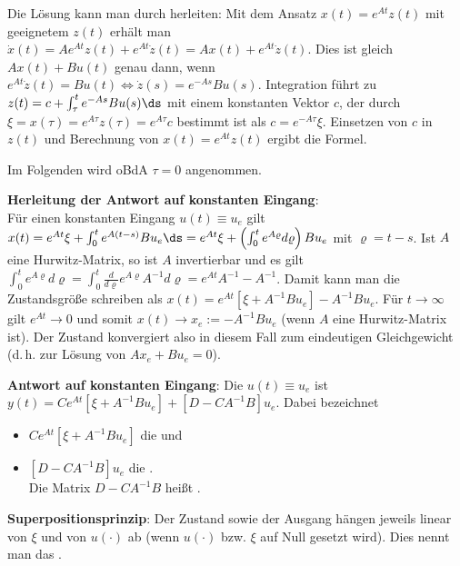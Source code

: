 Die Lösung kann man durch  herleiten:
Mit dem Ansatz $x(t) = e^{At} z(t)$ mit geeignetem $z(t)$
erhält man $\dot{x}(t) = A e^{At} z(t) + e^{At} \dot{z}(t) = Ax(t) + e^{At} \dot{z}(t)$.
Dies ist gleich $Ax(t) + Bu(t)$ genau dann, wenn $e^{At} \dot{z}(t) = Bu(t) \iff
\dot{z}(s) = e^{-As} Bu(s)$.
Integration führt zu $z(t) = c + \int_\tau^t e^{-As} Bu(s) \ds$ mit einem konstanten Vektor $c$,
der durch $\xi = x(\tau) = e^{A\tau} z(\tau) = e^{A\tau} c$ bestimmt ist als
$c = e^{-A\tau} \xi$.
Einsetzen von $c$ in $z(t)$ und Berechnung von $x(t) = e^{At} z(t)$ ergibt die Formel.

\linie

Im Folgenden wird oBdA $\tau = 0$ angenommen.

\textbf{Herleitung der Antwort auf konstanten Eingang}:\\
Für einen konstanten Eingang $u(t) \equiv u_e$ gilt\\
$x(t) = e^{At} \xi + \int_0^t e^{A(t - s)} B u_e \ds =
e^{At} \xi + \left(\int_0^t e^{A\varrho} d\varrho\right) B u_e$ mit $\varrho = t - s$.
Ist $A$ eine Hurwitz-Matrix, so ist $A$ invertierbar und es gilt
$\int_0^t e^{A\varrho} d\varrho = \int_0^t \frac{d}{d\varrho} e^{A\varrho} A^{-1} d\varrho
= e^{At} A^{-1} - A^{-1}$.
Damit kann man die Zustandsgröße schreiben als
$x(t) = e^{At} [\xi + A^{-1} B u_e] - A^{-1} B u_e$.
Für $t \to \infty$ gilt $e^{At} \to 0$ und somit
$x(t) \to x_e := -A^{-1} B u_e$
(wenn $A$ eine Hurwitz-Matrix ist).
Der Zustand konvergiert also in diesem Fall zum eindeutigen Gleichgewicht
(d.\,h. zur Lösung von $Ax_e + Bu_e = 0$).

\textbf{Antwort auf konstanten Eingang}:
Die  $u(t) \equiv u_e$ ist\\
$y(t) = Ce^{At} [\xi + A^{-1} B u_e] + [D - CA^{-1}B] u_e$.
Dabei bezeichnet
\begin{itemize}
    \item
    $Ce^{At} [\xi + A^{-1} B u_e]$ die  und

    \item
    $[D - CA^{-1} B] u_e$ die .\\
    Die Matrix $D - CA^{-1}B$ heißt
    .
\end{itemize}

\linie

\textbf{Superpositionsprinzip}:
Der Zustand sowie der Ausgang hängen jeweils linear von $\xi$ und von $u(\cdot)$ ab
(wenn $u(\cdot)$ bzw. $\xi$ auf Null gesetzt wird).
Dies nennt man das .


